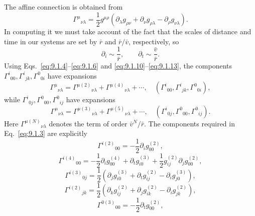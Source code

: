 The affine connection is obtained from
\[
  \Gamma^\mu{}_{\nu\lambda}
  =\frac12g^{\mu\rho}
  \left(
    \partial_\lambda g_{\rho\nu}
    +\partial_\nu g_{\rho\lambda}
    -\partial_\rho g_{\nu\lambda}
  \right).
\]
In computing it we must take account of the fact that the scales of distance
and time in our systems are set by \(\bar r\) and \(\bar r/\bar v\),
respectively, so
\[
  \partial_i\sim\frac1{\bar r},
  \qquad
  \partial_t\sim\frac{\bar v}{\bar r}.
\]
Using Eqs.~\eqref{eq:9.1.4}--\eqref{eq:9.1.6} and
\eqref{eq:9.1.10}--\eqref{eq:9.1.13}, the components
\(\Gamma^i{}_{00},\Gamma^i{}_{jk},\Gamma^0{}_{0i}\) have expansions
\begin{equation}
  \Gamma^\mu{}_{\nu\lambda}
  =\Gamma^{\mu(2)}{}_{\nu\lambda}
  +\Gamma^{\mu(4)}{}_{\nu\lambda}+\cdots,
  \quad
  (\Gamma^i{}_{00},\Gamma^i{}_{jk},\Gamma^0{}_{0i}),
  \tag{9.1.14}\label{eq:9.1.14}
\end{equation}
while \(\Gamma^i{}_{0j},\Gamma^0{}_{00},\Gamma^0{}_{ij}\) have expansions
\begin{equation}
  \Gamma^\mu{}_{\nu\lambda}
  =\Gamma^{\mu(3)}{}_{\nu\lambda}
  +\Gamma^{\mu(5)}{}_{\nu\lambda}+\cdots,
  \quad
  (\Gamma^i{}_{0j},\Gamma^0{}_{00},\Gamma^0{}_{ij}).
  \tag{9.1.15}\label{eq:9.1.15}
\end{equation}
Here \(\Gamma^{\mu(N)}{}_{\nu\lambda}\) denotes the term of order
\(\bar v^N/\bar r\). The components required in
Eq.~\eqref{eq:9.1.3} are explicitly
\begin{equation}
  \Gamma^{i(2)}{}_{00}=-\frac12\partial_i g_{00}^{(2)},
  \tag{9.1.16}\label{eq:9.1.16}
\end{equation}
\begin{equation}
  \Gamma^{i(4)}{}_{00}
  =-\frac12\partial_i g_{00}^{(4)}
   +\partial_t g_{i0}^{(3)}
   +\frac12g_{ij}^{(2)}\partial_j g_{00}^{(2)},
  \tag{9.1.17}\label{eq:9.1.17}
\end{equation}
\begin{equation}
  \Gamma^{i(3)}{}_{0j}
  =\frac12\left(
    \partial_jg_{i0}^{(3)}
    +\partial_tg_{ij}^{(2)}
    -\partial_i g_{j0}^{(3)}
  \right),
  \tag{9.1.18}\label{eq:9.1.18}
\end{equation}
\begin{equation}
  \Gamma^{i(2)}{}_{jk}
  =\frac12\left(
    \partial_k g_{ij}^{(2)}
    +\partial_j g_{ik}^{(2)}
    -\partial_i g_{jk}^{(2)}
  \right),
  \tag{9.1.19}\label{eq:9.1.19}
\end{equation}
\begin{equation}
  \Gamma^{0(3)}{}_{00}=-\frac12\partial_tg_{00}^{(2)},
  \tag{9.1.20}\label{eq:9.1.20}
\end{equation}
